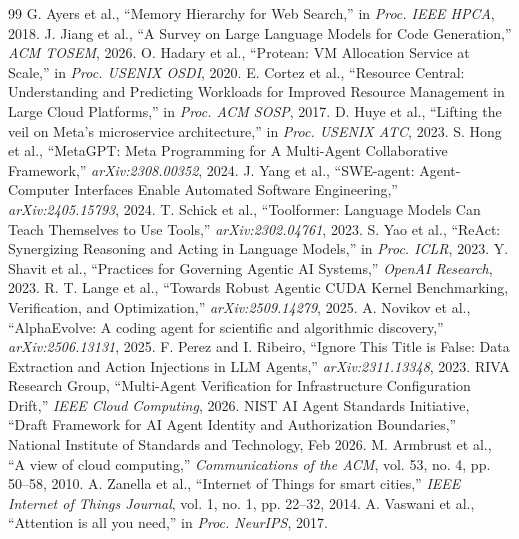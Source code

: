 \documentclass[conference]{IEEEtran}
\begin{document}
\FloatBarrier

\begin{thebibliography}{99}
 G. Ayers et al., ``Memory Hierarchy for Web Search,'' in \textit{Proc. IEEE HPCA}, 2018.
 J. Jiang et al., ``A Survey on Large Language Models for Code Generation,'' \textit{ACM TOSEM}, 2026.
 O. Hadary et al., ``Protean: VM Allocation Service at Scale,'' in \textit{Proc. USENIX OSDI}, 2020.
 E. Cortez et al., ``Resource Central: Understanding and Predicting Workloads for Improved Resource Management in Large Cloud Platforms,'' in \textit{Proc. ACM SOSP}, 2017.
 D. Huye et al., ``Lifting the veil on Meta's microservice architecture,'' in \textit{Proc. USENIX ATC}, 2023.
 S. Hong et al., ``MetaGPT: Meta Programming for A Multi-Agent Collaborative Framework,'' \textit{arXiv:2308.00352}, 2024.
 J. Yang et al., ``SWE-agent: Agent-Computer Interfaces Enable Automated Software Engineering,'' \textit{arXiv:2405.15793}, 2024.
 T. Schick et al., ``Toolformer: Language Models Can Teach Themselves to Use Tools,'' \textit{arXiv:2302.04761}, 2023.
 S. Yao et al., ``ReAct: Synergizing Reasoning and Acting in Language Models,'' in \textit{Proc. ICLR}, 2023.
 Y. Shavit et al., ``Practices for Governing Agentic AI Systems,'' \textit{OpenAI Research}, 2023.
 R. T. Lange et al., ``Towards Robust Agentic CUDA Kernel Benchmarking, Verification, and Optimization,'' \textit{arXiv:2509.14279}, 2025.
 A. Novikov et al., ``AlphaEvolve: A coding agent for scientific and algorithmic discovery,'' \textit{arXiv:2506.13131}, 2025.
 F. Perez and I. Ribeiro, ``Ignore This Title is False: Data Extraction and Action Injections in LLM Agents,'' \textit{arXiv:2311.13348}, 2023.
 RIVA Research Group, ``Multi-Agent Verification for Infrastructure Configuration Drift,'' \textit{IEEE Cloud Computing}, 2026.
 NIST AI Agent Standards Initiative, ``Draft Framework for AI Agent Identity and Authorization Boundaries,'' National Institute of Standards and Technology, Feb 2026.
 M. Armbrust et al., ``A view of cloud computing,'' \textit{Communications of the ACM}, vol. 53, no. 4, pp. 50--58, 2010.
 A. Zanella et al., ``Internet of Things for smart cities,'' \textit{IEEE Internet of Things Journal}, vol. 1, no. 1, pp. 22--32, 2014.
 A. Vaswani et al., ``Attention is all you need,'' in \textit{Proc. NeurIPS}, 2017.

\end{thebibliography}
\end{document}
